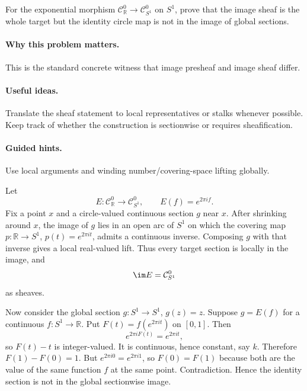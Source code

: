 \begin{problem}\label{prob:vi15-p5}
For the exponential morphism $\mathcal C^0_{\mathbb R}\to\mathcal C^0_{S^1}$ on $S^1$, prove that the image sheaf is the whole target but the identity circle map is not in the image of global sections.
\end{problem}

\ifdefined\FullProblemDossiers
\paragraph{Why this problem matters.}
This is the standard concrete witness that image presheaf and image sheaf differ.

\paragraph{Useful ideas.}
Translate the sheaf statement to local representatives or stalks whenever possible.  Keep track of whether the construction is sectionwise or requires sheafification.

\paragraph{Guided hints.}
Use local arguments and winding number/covering-space lifting globally.

\begin{solution}
Let
\[
E:\mathcal C^0_{\mathbb R}\longrightarrow\mathcal C^0_{S^1},\qquad E(f)=e^{2\pi if}.
\]
Fix a point $x$ and a circle-valued continuous section $g$ near $x$. After shrinking around $x$, the image of $g$ lies in an open arc of $S^1$ on which the covering map $p:\mathbb R\to S^1$, $p(t)=e^{2\pi it}$, admits a continuous inverse. Composing $g$ with that inverse gives a local real-valued lift. Thus every target section is locally in the image, and
\[
\im E=\mathcal C^0_{S^1}
\]
as sheaves.

Now consider the global section $g:S^1\to S^1$, $g(z)=z$. Suppose $g=E(f)$ for a continuous $f:S^1\to\mathbb R$. Put $F(t)=f(e^{2\pi it})$ on $[0,1]$. Then
\[
e^{2\pi iF(t)}=e^{2\pi it},
\]
so $F(t)-t$ is integer-valued. It is continuous, hence constant, say $k$. Therefore $F(1)-F(0)=1$. But $e^{2\pi i0}=e^{2\pi i1}$, so $F(0)=F(1)$ because both are the value of the same function $f$ at the same point. Contradiction. Hence the identity section is not in the global sectionwise image.
\end{solution}


